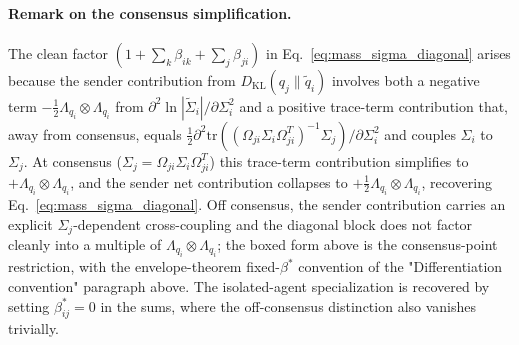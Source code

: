 \documentclass[11pt]{article}
\begin{document}
\paragraph{Remark on the consensus simplification.} The clean factor $(1 + \sum_k \beta_{ik} + \sum_j \beta_{ji})$ in Eq.~\eqref{eq:mass_sigma_diagonal} arises because the sender contribution from $D_{\mathrm{KL}}(q_j \| \tilde{q}_i)$ involves both a negative term $-\frac{1}{2}\Lambda_{q_i} \otimes \Lambda_{q_i}$ from $\partial^2 \ln |\tilde{\Sigma}_i|/\partial \Sigma_i^2$ and a positive trace-term contribution that, away from consensus, equals $\frac{1}{2}\partial^2 \mathrm{tr}((\Omega_{ji}\Sigma_i\Omega_{ji}^T)^{-1}\Sigma_j)/\partial\Sigma_i^2$ and couples $\Sigma_i$ to $\Sigma_j$. At consensus ($\Sigma_j = \Omega_{ji}\Sigma_i\Omega_{ji}^T$) this trace-term contribution simplifies to $+\Lambda_{q_i} \otimes \Lambda_{q_i}$, and the sender net contribution collapses to $+\frac{1}{2}\Lambda_{q_i}\otimes\Lambda_{q_i}$, recovering Eq.~\eqref{eq:mass_sigma_diagonal}. Off consensus, the sender contribution carries an explicit $\Sigma_j$-dependent cross-coupling and the diagonal block does not factor cleanly into a multiple of $\Lambda_{q_i}\otimes\Lambda_{q_i}$; the boxed form above is the consensus-point restriction, with the envelope-theorem fixed-$\beta^*$ convention of the "Differentiation convention" paragraph above. The isolated-agent specialization is recovered by setting $\beta_{ij}^* = 0$ in the sums, where the off-consensus distinction also vanishes trivially.
\end{document}
